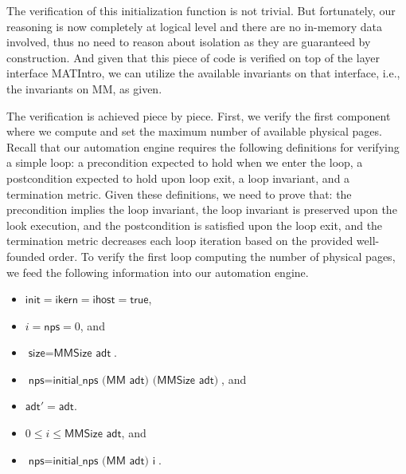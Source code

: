 The verification of this initialization function is not trivial. But fortunately, our reasoning
is now completely at logical level and there are no in-memory data involved, thus no need
to reason about isolation as they are guaranteed by construction.
And given that this piece of code is verified on top of the layer interface MATIntro,
we can utilize the available invariants on that interface, i.e., the invariants on \textsf{MM}, as given.

The verification is achieved piece by piece. First, we verify the first component where
we compute and set the maximum number of available physical pages.
Recall that our automation engine requires the following definitions for verifying a simple loop:
a precondition expected to hold when we enter the loop, a postcondition expected to hold
upon loop exit, a loop invariant, and a termination metric.
Given these definitions, we need to prove that: the precondition implies the loop invariant, the loop invariant
is preserved upon the look execution, and the postcondition is satisfied upon the loop exit, and the
termination metric decreases each loop iteration based on the provided well-founded order.
To verify the first loop computing the number of physical pages, we feed the
following information into our automation engine.

\begin{definition}[Precondition] 
\begin{itemize}
\item $\textsf{init} = \textsf{ikern} = \textsf{ihost} = \textsf{true}$,
\item $i=\textsf{nps}=0$, and
\item $\textsf{size}=\textsf{MMSize adt}$.
\end{itemize}
\end{definition}

\begin{definition}[Postcondition] 
\begin{itemize}
\item $\textsf{nps}=\textsf{initial\_nps (MM adt) (MMSize adt)}$, and 
\item $\textsf{adt}'=\textsf{adt}$.
\end{itemize}
\end{definition}

\begin{definition}
\begin{itemize}
\item $0\le i \le \textsf{MMSize adt}$, and
\item $\textsf{nps}=\textsf{initial\_nps (MM adt) i}$.
\end{itemize}
\end{definition}


